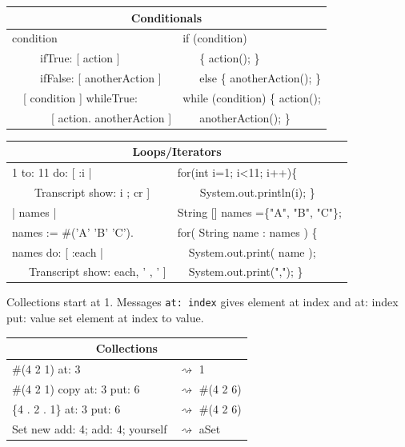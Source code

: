 \documentclass[notumble]{leaflet}
\newcommand{\ct}[1]{{\textsf{#1}}\xspace}
\newcommand{\code}[1]{\foreignlanguage{english}{\texttt{#1}}}
\begin{document}
\noindent
\begin{tabularx}{\linewidth}{@{}lX@{}}
        \toprule
        \multicolumn{2}{c}{\textbf{Conditionals}}\\
        \midrule
        
condition&if (condition) \\
\ \ \ \ \    ifTrue: [ action ] &      \ \ \   \{ action(); \} \\
\ \ \ \ \  ifFalse: [ anotherAction ]&   \ \ \     else \{ anotherAction(); \}\\
\midrule
\ \  [ condition ] whileTrue:&while (condition) \{ action();\\
\ \ \ \ \ \ \  [ action. anotherAction ]&\ \ \     anotherAction(); \}\\
\end{tabularx}

\noindent
\begin{tabularx}{\linewidth}{@{}lX@{}}
        \toprule
        \multicolumn{2}{c}{\textbf{Loops/Iterators}}\\
\midrule
1 to: 11 do: [ :i | &for(int i=1; i<11; i++)\{ \\
\ \ \ \ Transcript show: i ; cr ]&\ \ \ \    System.out.println(i); \}\\
  \midrule
| names | &String [] names =\{"A", "B", "C"\};\\  
names := \#('A' 'B' 'C').&for( String name : names ) \{\\
names do: [ :each |&\ \      System.out.print( name );\\
 \ \ \ Transcript show: each, ' , ' ]&\ \     System.out.print(","); \} \\
\midrule
\end{tabularx}

Collections start at 1. Messages \code{at: index} gives element at index and \ct{at: index put: value} set element at index to value.

\noindent
\begin{tabularx}{\linewidth}{@{}lX@{}}
     \toprule
      \multicolumn{2}{c}{\textbf{Collections}}\\
      \midrule
     \textcolor{string}{\#(4 2 1) at: 3}& $\rightsquigarrow$ 1 \\
     \textcolor{string}{\#(4 2 1) copy at: 3 put: 6}& $\rightsquigarrow$ \#(4 2 6) \\
     \textcolor{string}{\{4 . 2 . 1\} at: 3 put: 6}& $\rightsquigarrow$ \#(4 2 6) \\
     \textcolor{string}{Set new add: 4; add: 4; yourself}& $\rightsquigarrow$ aSet \\
     \midrule
\end{tabularx}
\end{document}
